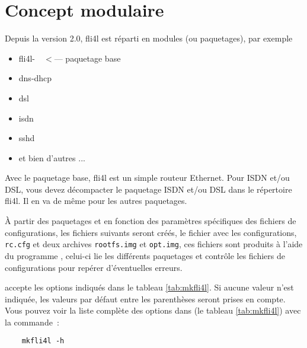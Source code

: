 
\section{Concept modulaire}

Depuis la version 2.0, fli4l est réparti en modules (ou paquetages),
par exemple
\begin{itemize}
    \item fli4l-\version~~$<$--- paquetage base

    \item dns-dhcp
    \item dsl
    \item isdn
    \item sshd
\item et bien d'autres ...
\end{itemize}

Avec le paquetage base, fli4l est un simple routeur Ethernet. Pour ISDN
et/ou DSL, vous devez décompacter le paquetage ISDN et/ou DSL dans le
répertoire fli4l. Il en va de même pour les autres paquetages.



À partir des paquetages et en fonction des paramètres spécifiques des fichiers
de configurations, les fichiers suivants seront créés, le fichier avec
les configurations, \texttt{rc.cfg} et deux archives \texttt{rootfs.img} et
\texttt{opt.img}, ces fichiers sont produits à l'aide du programme ,
celui-ci lie les différents paquetages et contrôle les fichiers de
configurations pour repérer d'éventuelles erreurs.

 accepte les options indiqués dans le tableau \ref{tab:mkfli4l}. Si
aucune valeur n'est indiquée, les valeurs par défaut entre les parenthèses
seront prises en compte. Vous pouvez voir la liste complète des options dans
(le tableau \ref{tab:mkfli4l}) avec la commande~:

\begin{verbatim}
    mkfli4l -h
\end{verbatim}

